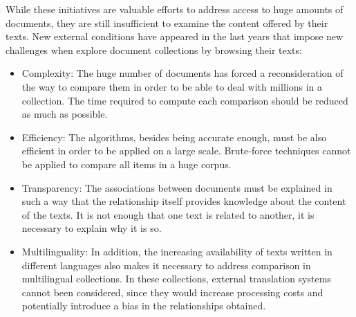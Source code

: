 While these initiatives are valuable efforts to address access to huge amounts of documents, they are still insufficient to examine the content offered by their texts. New external conditions have appeared in the last years that impose new challenges when explore document collections by browsing their texts:
\begin{itemize}
\item Complexity: The huge number of documents has forced a reconsideration of the way to compare them in order to be able to deal with millions in a collection. The time required to compute each comparison should be reduced as much as possible.
\item Efficiency: The algorithms, besides being accurate enough, must be also efficient in order to be applied on a large scale. Brute-force techniques cannot be applied to compare all items in a huge corpus.
\item Transparency: The associations between documents must be explained in such a way that the relationship itself provides knowledge about the content of the texts. It is not enough that one text is related to another, it is necessary to explain why it is so. 
\item Multilinguality: In addition, the increasing availability of texts written in different languages also makes it necessary to address comparison in multilingual collections. In these collections, external translation systems cannot been considered, since they would increase processing costs and potentially introduce a bias in the relationships obtained. 
\end{itemize}

